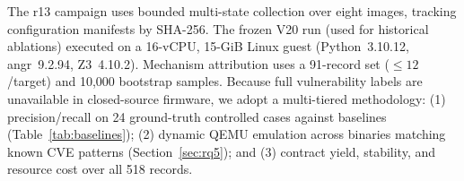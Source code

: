 \begin{table}[!t]
\centering
\caption{Current bounded multi-state campaign. ``Complete'' counts direct
profiles with a verified complete C string; ``Prefix'' counts observed-prefix
profiles and is a weaker scope. ``Src'' and ``Tpl'' are static obligations;
``Res.'' is a typed residual.}
\label{tab:corpus}
\footnotesize
\setlength{\tabcolsep}{2.75pt}
\renewcommand{\arraystretch}{1.09}
\end{table}

The r13 campaign uses bounded multi-state collection over eight images, tracking configuration manifests by SHA-256. The frozen V20 run (used for historical ablations) executed on a 16-vCPU, 15-GiB Linux guest (Python~3.10.12, angr~9.2.94, Z3~4.10.2). Mechanism attribution uses a 91-record set ($\le 12$/target) and 10,000 bootstrap samples. Because full vulnerability labels are unavailable in closed-source firmware, we adopt a multi-tiered methodology: (1) precision/recall on 24 ground-truth controlled cases against baselines (Table~\ref{tab:baselines}); (2) dynamic QEMU emulation across binaries matching known CVE patterns (Section~\ref{sec:rq5}); and (3) contract yield, stability, and resource cost over all 518 records.

